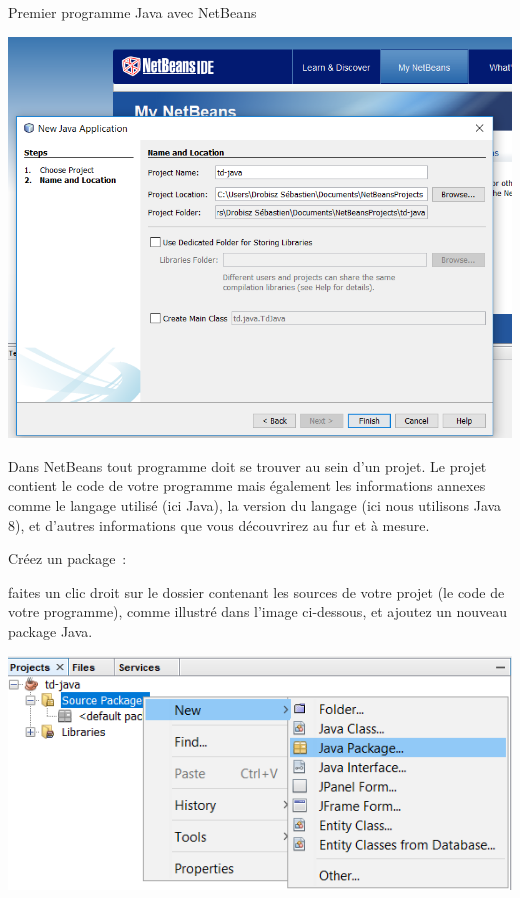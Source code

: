 \documentclass[a4paper,11pt]{style-esi/td}
\begin{document}
\begin{Tutoriel}{Premier programme Java avec NetBeans}
\begin{steps}
		\begin{center}
			\includegraphics[width=.9\textwidth]{images/nb_newproject_name}
		\end{center}

		Dans NetBeans tout programme doit se trouver au sein d'un projet.
		Le projet contient le code de votre programme mais également les
		informations annexes comme le langage utilisé (ici Java),
		la version du langage (ici nous utilisons Java 8),
		et d'autres informations que vous découvrirez au fur et à mesure.



		\item Créez un package~:

		faites un clic droit sur le dossier contenant les sources de votre projet
		(le code de votre programme), comme illustré dans l'image ci-dessous,
		et ajoutez un nouveau package Java.

		\bigskip
		\begin{center}
			\includegraphics[width=.9\textwidth]{images/nb_newproject_package}
		\end{center}


\end{steps}
\end{Tutoriel}
\end{document}
